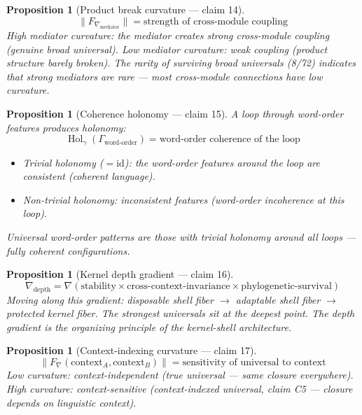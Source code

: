 \documentclass[11pt,a4paper]{article}
\newtheorem{proposition}[definition]{Proposition}
\begin{document}
\begin{proposition}[Product break curvature --- claim 14]
\label{prop:break}
\[
  \|F_{\nabla_{\text{mediator}}}\| = \text{strength of cross-module
    coupling}
\]
High mediator curvature: the mediator creates strong cross-module
coupling (genuine broad universal). Low mediator curvature: weak
coupling (product structure barely broken). The rarity of surviving
broad universals (8/72) indicates that strong mediators are rare ---
most cross-module connections have low curvature.
\end{proposition}

\begin{proposition}[Coherence holonomy --- claim 15]
\label{prop:coherence}
A loop through word-order features produces holonomy:
\[
  \operatorname{Hol}_\gamma(\Gamma_{\text{word-order}}) = \text{word-order
    coherence of the loop}
\]
\begin{itemize}
  \item Trivial holonomy ($= \mathrm{id}$): the word-order features around
    the loop are consistent (coherent language).
  \item Non-trivial holonomy: inconsistent features (word-order
    incoherence at this loop).
\end{itemize}
Universal word-order patterns are those with trivial holonomy around all
loops --- fully coherent configurations.
\end{proposition}

\begin{proposition}[Kernel depth gradient --- claim 16]
\label{prop:depth}
\[
  \nabla_{\text{depth}} = \nabla\left(\text{stability} \times
    \text{cross-context-invariance} \times
    \text{phylogenetic-survival}\right)
\]
Moving along this gradient: disposable shell fiber $\to$ adaptable shell
fiber $\to$ protected kernel fiber. The strongest universals sit at the
deepest point. The depth gradient is the organizing principle of the
kernel-shell architecture.
\end{proposition}

\begin{proposition}[Context-indexing curvature --- claim 17]
\label{prop:context}
\[
  \|F_\nabla(\text{context}_A, \text{context}_B)\| = \text{sensitivity
    of universal to context}
\]
Low curvature: context-independent (true universal --- same closure
everywhere). High curvature: context-sensitive (context-indexed
universal, claim C5 --- closure depends on linguistic context).
\end{proposition}
\end{document}
